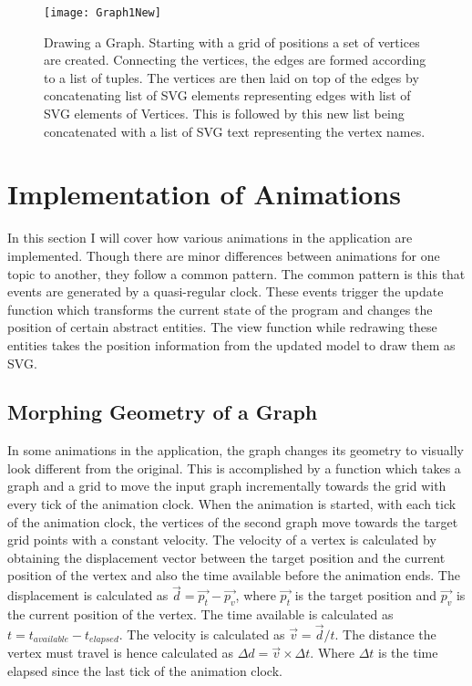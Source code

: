 \begin{figure}[!ht]
\centering
\texttt{[image: Graph1New]}
\caption{
         Drawing a Graph. Starting with a grid of positions
         a set of vertices are created. Connecting the vertices,
         the edges are formed according to a list of tuples. The 
         vertices are then laid on top of the edges by concatenating list
         of SVG elements representing edges with list of SVG elements
         of Vertices. This is followed by this new list being concatenated
         with a list of SVG text representing the vertex names.
        }
\end{figure}

\section{Implementation of Animations}
In this section I will cover how various animations in the
application are implemented. Though there are minor differences between animations
for one topic to another, they follow a common pattern. The common pattern is
this that events are generated by a quasi-regular clock. These events trigger
the update function which transforms the current state of the program and
changes the position of certain abstract entities. The view function while
redrawing these entities takes the position information from the updated model
to draw them as SVG.

\subsection{Morphing Geometry of a Graph}
\label{animation: morphing}
In some animations in the application, the graph changes its geometry
to visually look different from the original. This is accomplished by a
function which takes a graph and a grid to move the input graph incrementally
towards the grid with every tick of the animation clock.  When the animation is
started, with each tick of the animation clock, the vertices of the second
graph move towards the target grid points with a constant velocity.  The
velocity of a vertex is calculated by obtaining the displacement vector between
the target position and the current position of the vertex and also the time
available before the animation ends.  The displacement is calculated as
$\vec{d} = \vec{p_t} - \vec{p_v}$, where $\vec{p_t}$ is the target position and
$\vec{p_v}$ is the current position of the vertex. The time available is
calculated as $t = t_{available} - t_{elapsed}$. The velocity is calculated as
$\vec{v} = \vec{d}/t$.  The distance the vertex must travel is hence calculated
as $\Delta d = \vec{v} \times \Delta t$.  Where $\Delta t$ is the time elapsed
since the last tick of the animation clock.


